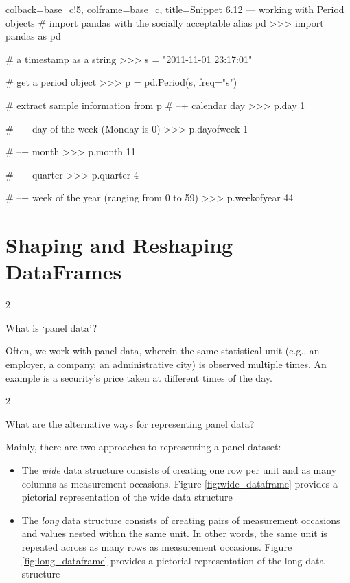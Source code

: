 \documentclass[a4paper,11pt]{book}
\newcommand{\question}[1]{%
    \begin{tcolorbox}[colback=comp_c!10,colframe=comp_c,sidebyside align=top,width=\linewidth,before skip=1ex]
        #1
    \end{tcolorbox}
    \switchcolumn%
}
\newcommand{\note}[1]{%
    \begin{tcolorbox}[colback=white!0,colframe=white!10,width=\linewidth,before skip=1ex]
        #1
    \end{tcolorbox}
}
\begin{document}
\begin{pythoncode}[linenos=True]{colback=base_c!5, colframe=base_c, title=\sffamily Snippet 6.12 --- working with Period objects}
# import pandas with the socially acceptable alias pd
>>> import pandas as pd

# a timestamp as a string
>>> s = "2011-11-01 23:17:01"

# get a period object
>>> p = pd.Period(s, freq="s")

# extract sample information from p
# --+ calendar day
>>> p.day
1

# --+ day of the week (Monday is 0)
>>> p.dayofweek
1

# --+ month
>>> p.month
11

# --+ quarter
>>> p.quarter
4

# --+ week of the year (ranging from 0 to 59)
>>> p.weekofyear
44
\end{pythoncode}

\section{Shaping and Reshaping DataFrames}
\label{sec:wide_long}

\begin{paracol}{2}
	\question{
		\raggedright What is `panel data'?
	}
	\note{
		Often, we work with panel data, wherein the same statistical unit (e.g., an employer, a company, an administrative city) is observed multiple times. An example is a security's price taken at different times of the day.
	}
\end{paracol}

\begin{paracol}{2}
	\question{
		\raggedright What are the alternative ways for representing panel data?
	}
	\note{
		Mainly, there are two approaches to representing a panel dataset:

		\begin{itemize}
			\item The \textit{wide} data structure consists of creating one row per unit and as many columns as measurement occasions. Figure \ref{fig:wide_dataframe} provides a pictorial representation of the wide data structure
			\item The \textit{long} data structure consists of creating pairs of measurement occasions and values nested within the same unit. In other words, the same unit is repeated across as many rows as measurement occasions. Figure \ref{fig:long_dataframe} provides a pictorial representation of the long data structure
		\end{itemize}
	}
\end{paracol}
\end{document}

